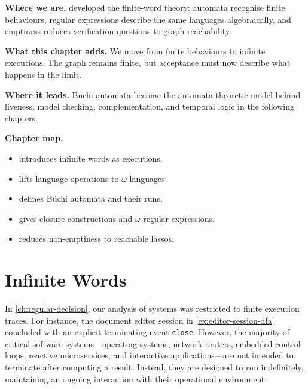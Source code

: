 \begin{chapteropening}
\textbf{Where we are.}   developed the
finite-word theory: automata recognise finite behaviours, regular
expressions describe the same languages algebraically, and emptiness reduces
verification questions to graph reachability.

\textbf{What this chapter adds.}  We move from finite behaviours to infinite
executions.  The graph remains finite, but acceptance must now describe what
happens in the limit.

\textbf{Where it leads.}  B\"uchi automata become the automata-theoretic
model behind liveness, model checking, complementation, and temporal logic in
the following chapters.

\textbf{Chapter map.}
\begin{itemize}[nosep]
  \item {} introduces infinite words as executions.
  \item {} lifts language operations to
        $\omega$-languages.
  \item {} defines B\"uchi automata and their runs.
  \item {} gives closure constructions and
        $\omega$-regular expressions.
  \item {} reduces non-emptiness to reachable lassos.
\end{itemize}
\end{chapteropening}



\section{Infinite Words}
\label{sec:omega-words}

In \cref{ch:regular-decision}, our analysis of systems was restricted to
finite execution traces.  For instance, the document editor session in
\cref{ex:editor-session-dfa} concluded with an explicit terminating event
\texttt{close}.  However, the majority of critical software systems---operating
systems, network routers, embedded control loops, reactive microservices, and
interactive applications---are not intended to terminate after computing a
result.  Instead, they are designed to run indefinitely, maintaining an ongoing
interaction with their operational environment.

